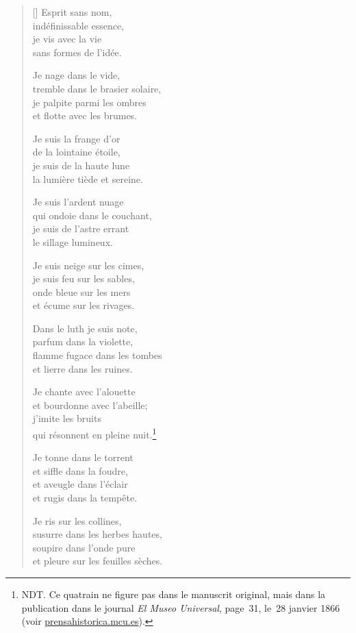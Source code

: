 \documentclass[a4paper,12pt]{book}
\begin{document}
\begin{verse}[\versewidth]
  Esprit sans nom, \\
  indéfinissable essence, \\
  je vis avec la vie \\
  sans formes de l'idée.

  Je nage dans le vide, \\
  tremble dans le brasier solaire, \\
  je palpite parmi les ombres \\
  et flotte avec les brumes.

  Je suis la frange d'or \\
  de la lointaine étoile, \\
  je suis de la haute lune \\
  la lumière tiède et sereine.

  Je suis l'ardent nuage \\
  qui ondoie dans le couchant, \\
  je suis de l'astre errant \\
  le sillage lumineux.

  Je suis neige sur les cimes, \\
  je suis feu sur les sables, \\
  onde bleue sur les mers \\
  et écume sur les rivages.

  Dans le luth je suis note, \\
  parfum dans la violette, \\
  flamme fugace dans les tombes \\
  et lierre dans les ruines.

  Je chante avec l'alouette \\
  et bourdonne avec l'abeille; \\
  j'imite les bruits \\
  qui résonnent en pleine nuit.\footnote{NDT. Ce quatrain ne
figure pas dans le manuscrit original, mais dans la publication dans
le journal \emph{El Museo Universal}, page~31, le~28 janvier 1866 (voir \url{prensahistorica.mcu.es}).}

  Je tonne dans le torrent \\
  et siffle dans la foudre, \\
  et aveugle dans l'éclair \\
  et rugis dans la tempête.

  Je ris sur les collines, \\
  susurre dans les herbes hautes, \\
  soupire dans l'onde pure \\
  et pleure sur les feuilles sèches.


\end{verse}
\end{document}
